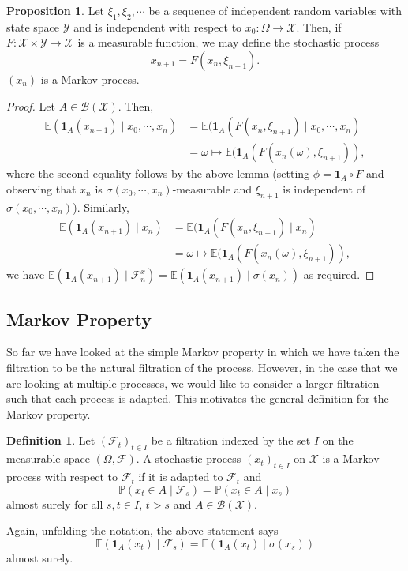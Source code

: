 \documentclass[]{article}
\theoremstyle{definition}
\theoremstyle{definition}
\newtheorem{definition}{Definition}[section]
\newtheorem{proposition}{Proposition}[section]
\begin{document}
\begin{proposition}
  Let \(\xi_1, \xi_2, \cdots\) be a sequence of independent random variables with 
  state space \(\mathcal{Y}\) and is independent with respect to 
  \(x_0 : \Omega \to \mathcal{X}\). Then, if \(F : \mathcal{X} \times \mathcal{Y} \to \mathcal{X}\) 
  is a measurable function, we may define the stochastic process 
  \[x_{n + 1} = F(x_n, \xi_{n + 1}).\]
  \((x_n)\) is a Markov process. 
\end{proposition}
\begin{proof}
  Let \(A \in \mathcal{B}(\mathcal{X})\). Then, 
  \[\begin{split}
    \mathbb{E}(\mathbf{1}_A(x_{n + 1}) \mid x_0, \cdots, x_n) 
    & = \mathbb{E}(\mathbf{1}_A(F(x_n, \xi_{n + 1}) \mid x_0, \cdots, x_n) \\
    & = \omega \mapsto \mathbb{E}(\mathbf{1}_A(F(x_n(\omega), \xi_{n + 1})),
  \end{split}\]
  where the second equality follows by the above lemma (setting \(\phi = \mathbf{1}_A \circ F\) 
  and observing that \(x_n\) is \(\sigma(x_0, \cdots, x_n)\)-measurable and 
  \(\xi_{n + 1}\) is independent of \(\sigma(x_0, \cdots, x_n)\)). Similarly, 
  \[\begin{split}
    \mathbb{E}(\mathbf{1}_A(x_{n + 1}) \mid x_n) 
    & = \mathbb{E}(\mathbf{1}_A(F(x_n, \xi_{n + 1}) \mid x_n) \\
    & = \omega \mapsto \mathbb{E}(\mathbf{1}_A(F(x_n(\omega), \xi_{n + 1})),
  \end{split}\]
  we have \(\mathbb{E}(\mathbf{1}_A(x_{n + 1}) \mid \mathcal{F}^x_n) = 
  \mathbb{E}(\mathbf{1}_A(x_{n + 1}) \mid \sigma(x_n))\) as required.
\end{proof}

\subsection{Markov Property}

So far we have looked at the simple Markov property in which we have taken the 
filtration to be the natural filtration of the process. However, in the case 
that we are looking at multiple processes, we would like to consider a larger 
filtration such that each process is adapted. This motivates the general definition 
for the Markov property.

\begin{definition}
  Let \((\mathcal{F}_t)_{t \in I}\) be a filtration indexed by the set \(I\) on 
  the measurable space \((\Omega, \mathcal{F})\). A stochastic process \((x_t)_{t \in I}\) 
  on \(\mathcal{X}\) is a Markov process with respect to \(\mathcal{F}_t\) if it 
  is adapted to \(\mathcal{F}_t\) and 
  \[\mathbb{P}(x_t \in A \mid \mathcal{F}_s) = \mathbb{P}(x_t \in A \mid x_s)\]
  almost surely for all \(s, t \in I\), \(t > s\) and \(A \in \mathcal{B}(\mathcal{X})\).

  Again, unfolding the notation, the above statement says 
  \[\mathbb{E}(\mathbf{1}_A(x_t) \mid \mathcal{F}_s) = \mathbb{E}(\mathbf{1}_A(x_t) \mid \sigma(x_s))\]
  almost surely.
\end{definition}
\end{document}
